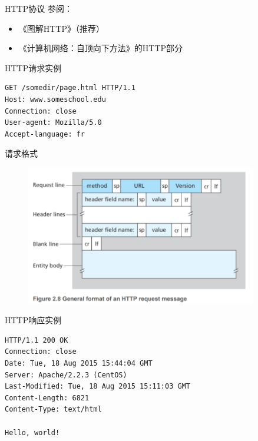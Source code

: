 \documentclass[UTF8]{ctexbeamer}
\begin{document}
\begin{frame}{HTTP协议}
    参阅：
    \begin{itemize}
        \item 《图解HTTP》（推荐）
        \item 《计算机网络：自顶向下方法》的HTTP部分
    \end{itemize}
\end{frame}
\begin{frame}[fragile]{HTTP请求实例}
    \begin{verbatim}
GET /somedir/page.html HTTP/1.1
Host: www.someschool.edu
Connection: close
User-agent: Mozilla/5.0
Accept-language: fr
\end{verbatim}
\end{frame}
\begin{frame}{请求格式}
    \begin{figure}
        \centering
        \includegraphics[width=0.9\textwidth]{http-request.png}
    \end{figure}
\end{frame}

\begin{frame}[fragile]{HTTP响应实例}
    \begin{verbatim}
HTTP/1.1 200 OK
Connection: close
Date: Tue, 18 Aug 2015 15:44:04 GMT
Server: Apache/2.2.3 (CentOS)
Last-Modified: Tue, 18 Aug 2015 15:11:03 GMT
Content-Length: 6821
Content-Type: text/html

Hello, world!
\end{verbatim}
\end{frame}
\end{document}
